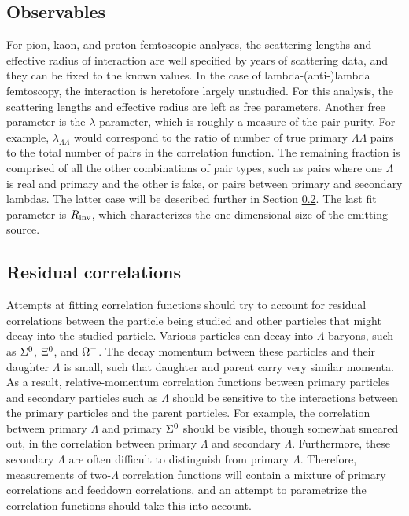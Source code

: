 \subsection{Observables}
\label{sec:Observables}
For pion, kaon, and proton femtoscopic analyses, the scattering lengths and effective radius of interaction are well specified by years of scattering data, and they can be fixed to the known values.  In the case of lambda-(anti-)lambda femtoscopy, the interaction is heretofore largely unstudied.  For this analysis, the scattering lengths and effective radius are left as free parameters.  Another free parameter is the $\lambda$ parameter, which is roughly a measure of the pair purity.  For example, $\lambda_{\Lambda\Lambda}$ would correspond to the ratio of number of true primary $\Lambda\Lambda$ pairs to the total number of pairs in the correlation function. The remaining fraction is comprised of all the other combinations of pair types, such as pairs where one $\Lambda$ is real and primary and the other is fake, or pairs between primary and secondary lambdas.  The latter case will be described further in Section \ref{sec:Residual}.  The last fit parameter is $R_{\rm inv}$, which characterizes the one dimensional size of the emitting source.  


\subsection{Residual correlations}
\label{sec:Residual}

Attempts at fitting correlation functions should try to account for residual correlations between the particle being studied and other particles that might decay into the studied particle.  Various particles can decay into $\Lambda$ baryons, such as $\Sigma^{\rm 0}$, $\Xi^{\rm 0}$, and $\Omega^{\rm -}$.  The decay momentum between these particles and their daughter $\Lambda$ is small, such that daughter and parent carry very similar momenta.  As a result, relative-momentum correlation functions between primary particles and secondary particles such as $\Lambda$ should be sensitive to the interactions between the primary particles and the parent particles.  For example, the correlation between primary $\Lambda$ and primary $\Sigma^{\rm 0}$ should be visible, though somewhat smeared out, in the correlation between primary $\Lambda$ and secondary $\Lambda$.  Furthermore, these secondary $\Lambda$ are often difficult to distinguish from primary $\Lambda$.  Therefore, measurements of two-$\Lambda$ correlation functions will contain a mixture of primary correlations and feeddown correlations, and an attempt to parametrize the correlation functions should take this into account.  

